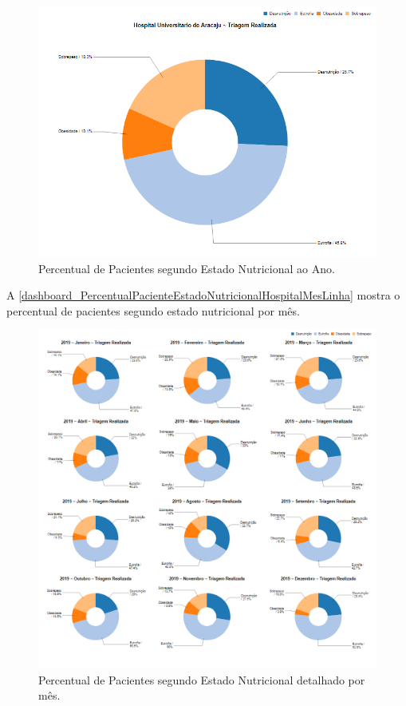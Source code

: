 \begin{figure}[htb]
	\caption{\label{dashboard_PercentualPacienteEstadoNutricionalHospitalAnoPizza}Percentual de Pacientes segundo Estado Nutricional ao Ano.}
	\begin{center}
	    \includegraphics[scale=0.6]{Imagens/3.1.PercentualPacienteEstadoNutricionalHospitalAnoPizza.png}
	\end{center}
\end{figure}

\newpage
A \autoref{dashboard_PercentualPacienteEstadoNutricionalHospitalMesLinha} mostra o percentual de pacientes segundo estado nutricional por mês.

\begin{figure}[htb]
	\caption{\label{dashboard_PercentualPacienteEstadoNutricionalHospitalMesLinha}Percentual de Pacientes segundo Estado Nutricional detalhado por mês.}
	\begin{center}
	    \includegraphics[scale=0.6]{Imagens/3.2.PercentualPacienteEstadoNutricionalHospitalMesLinha.png}
	\end{center}
\end{figure}

